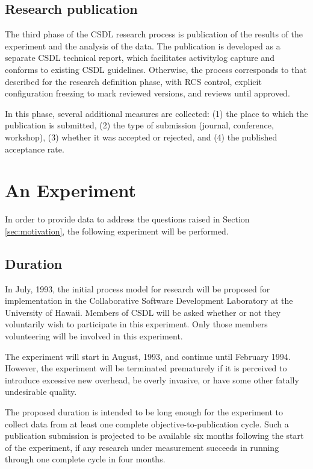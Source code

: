 \subsection{Research publication}

The third phase of the CSDL research process is publication of the results
of the experiment and the analysis of the data.  The publication is
developed as a separate CSDL technical report, which facilitates
activitylog capture and conforms to existing CSDL guidelines.  Otherwise,
the process corresponds to that described for the research definition
phase, with RCS control, explicit configuration freezing to mark reviewed
versions, and reviews until approved.

In this phase, several additional measures are collected: (1) the place to
which the publication is submitted, (2) the type of submission (journal,
conference, workshop), (3) whether it was accepted or rejected, and (4) the
published acceptance rate.

\section{An Experiment}

In order to provide data to address the questions raised in Section
\ref{sec:motivation}, the following experiment will be performed. 

\subsection{Duration}

In July, 1993, the initial process model for research will be proposed for
implementation in the Collaborative Software Development Laboratory at the
University of Hawaii.  Members of CSDL will be asked whether or not they
voluntarily wish to participate in this experiment.  Only those members
volunteering will be involved in this experiment.

The experiment will start in August, 1993, and continue until February
1994.  However, the experiment will be terminated prematurely if it is
perceived to introduce excessive new overhead, be overly invasive, or have
some other fatally undesirable quality.

The proposed duration is intended to be long enough for the experiment to
collect data from at least one complete objective-to-publication cycle.
Such a publication submission is projected to be available six months
following the start of the experiment, if any research under measurement
succeeds in running through one complete cycle in four months.

